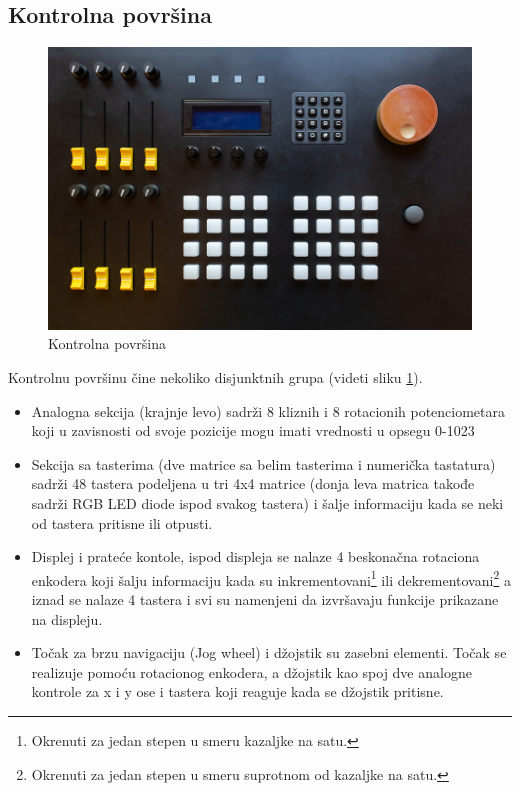 \documentclass[12pt,oneside]{memoir}
\begin{document}
	\subsection{Kontrolna površina}
	\begin{figure}[h]
		\includegraphics[width=\textwidth]{Top}
		\caption{Kontrolna površina}
		\label{Slika:Top}
	\end{figure}
	
	Kontrolnu površinu čine nekoliko disjunktnih grupa (videti sliku \ref{Slika:Top}).
	\begin{itemize}
		\item Analogna sekcija (krajnje levo) sadrži 8 kliznih i 8 rotacionih potenciometara koji u zavisnosti od svoje pozicije mogu imati vrednosti u opsegu 0-1023
		\item Sekcija sa tasterima (dve matrice sa belim tasterima i numerička tastatura) sadrži 48 tastera podeljena u tri 4x4 matrice (donja leva matrica takođe sadrži RGB LED diode ispod svakog tastera) i šalje informaciju kada se neki od tastera pritisne ili otpusti.
		\item Displej i prateće kontole, ispod displeja se nalaze 4 beskonačna rotaciona enkodera koji šalju informaciju kada su inkrementovani\footnote{Okrenuti za jedan stepen u smeru kazaljke na satu.} ili dekrementovani\footnote{Okrenuti za jedan stepen u smeru suprotnom od kazaljke na satu.} a iznad se nalaze 4 tastera i svi su namenjeni da izvršavaju funkcije prikazane na displeju.
		\item Točak za brzu navigaciju (Jog wheel) i džojstik su zasebni elementi. Točak se realizuje pomoću rotacionog enkodera, a džojstik kao spoj dve analogne kontrole za x i y ose i tastera koji reaguje kada se džojstik pritisne. 
	\end{itemize}
	
\end{document}
